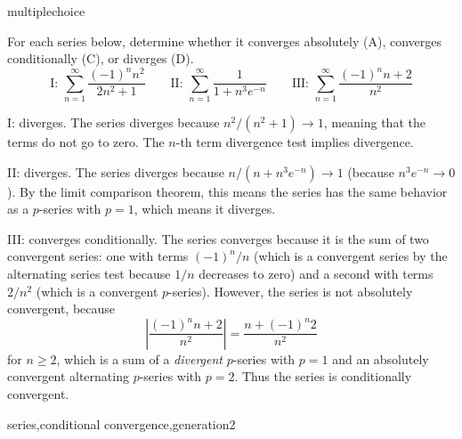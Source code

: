 \documentclass{ximera}
\begin{document}
\begin{question}[seriesacd004]
\begin{type}
multiplechoice
\end{type}
For each series below, determine whether it converges absolutely (A), converges conditionally (C), or diverges (D).  \[\text{I: } \sum_{n = 1}^\infty\frac{(-1)^n n^2}{2 n^2+1} \qquad \text{II: } \sum_{n = 1}^\infty\frac{1}{1 + n^3 e^{-n}} \qquad \text{III: } \sum_{n = 1}^\infty\frac{(-1)^n n + 2}{n^2}\]
\begin{multiplechoice}
 \choicebreak
{}
\end{multiplechoice}
\begin{feedback}
I: diverges. The series diverges because \(n^2/(n^2+1) \rightarrow 1\), meaning that the terms do not go to zero. The \(n\)-th term divergence test implies divergence.

II: diverges. The series diverges because \(n / (n + n^3 e^{-n}) \rightarrow 1\) (because \(n^3 e^{-n} \rightarrow 0\)). By the limit comparison theorem, this means the series has the same behavior as a \(p\)-series with \(p=1\), which means it diverges.

III: converges conditionally. The series converges because it is the sum of two convergent series: one with terms \((-1)^n / n\) (which is a convergent series by the alternating series test because \(1/n\) decreases to zero) and a second with terms \(2/n^2\) (which is a convergent \(p\)-series). However, the series is not absolutely convergent, because \[ \left| \frac{(-1)^n n + 2}{n^2} \right| = \frac{n + (-1)^n2}{n^2}\] for \(n \geq 2\), which is a sum of a {\it divergent} \(p\)-series with \(p=1\) and an absolutely convergent alternating \(p\)-series with \(p=2\). Thus the series is conditionally convergent.
\end{feedback}
\begin{keywords}
series,conditional convergence,generation2
\end{keywords}
\end{question}
\end{document}
